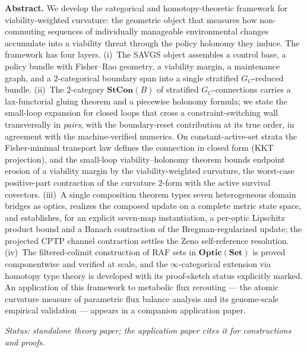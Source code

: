 \documentclass[11pt,a4paper]{article}
\theoremstyle{plain}
\theoremstyle{definition}
\theoremstyle{remark}
\newcommand{\Optic}{\mathbf{Optic}}
\begin{document}
\begin{center}
\begin{minipage}{0.92\textwidth}
\small
\textbf{Abstract.} We develop the categorical and
homotopy-theoretic framework for viability-weighted curvature: the
geometric object that measures how non-commuting sequences of
individually manageable environmental changes accumulate into a
viability threat through the policy holonomy they induce. The
framework has four layers. (i)~The SAVGS object assembles a control
base, a policy bundle with Fisher--Rao geometry, a viability margin,
a maintenance graph, and a $2$-categorical boundary span into a
single stratified $G_C$-reduced bundle. (ii)~The $2$-category
$\mathbf{StCon}(B)$ of stratified $G_C$-connections carries a
lax-functorial gluing theorem and a piecewise holonomy formula; we
state the small-loop expansion for closed loops that cross a
constraint-switching wall transversally in \emph{pairs}, with the
boundary-reset contribution at its true order, in agreement with the
machine-verified numerics. On constant-active-set strata the
Fisher-minimal transport law defines the connection in closed form
(KKT projection), and the small-loop viability--holonomy theorem
bounds endpoint erosion of a viability margin by the
viability-weighted curvature, the worst-case positive-part
contraction of the curvature $2$-form with the active survival
covectors. (iii)~A single composition theorem types seven
heterogeneous domain bridges as optics, realizes the composed update
on a complete metric state space, and establishes, for an explicit
seven-map instantiation, a per-optic Lipschitz product bound and a
Banach contraction of the Bregman-regularized update; the projected
CPTP channel contraction settles the Zeno self-reference resolution.
(iv)~The filtered-colimit construction of RAF sets in
$\Optic(\mathbf{Set})$ is proved componentwise and verified at
scale, and the $\infty$-categorical extension via homotopy type
theory is developed with its proof-sketch status explicitly marked.
An application of this framework to metabolic flux rerouting --- the
atomic curvature measure of parametric flux balance analysis and its
genome-scale empirical validation --- appears in a companion
application paper.
\par
\vspace{0.4em}
\emph{Status: standalone theory paper; the application paper
\citep{zai2026measure} cites it for constructions and proofs.}
\end{minipage}
\end{center}
\end{document}
